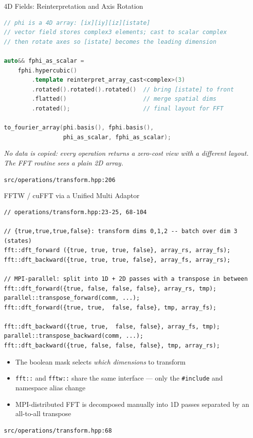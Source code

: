 \begin{frame}[fragile,label=inq4]{4D Fields: Reinterpretation and Axis Rotation}
\begin{lstlisting}[language=C++]
// phi is a 4D array: [ix][iy][iz][istate]
// vector field stores complex3 elements; cast to scalar complex
// then rotate axes so [istate] becomes the leading dimension

auto&& fphi_as_scalar =
    fphi.hypercubic()
        .template reinterpret_array_cast<complex>(3)
        .rotated().rotated().rotated()  // bring [istate] to front
        .flatted()                      // merge spatial dims
        .rotated();                     // final layout for FFT

to_fourier_array(phi.basis(), fphi.basis(),
                 phi_as_scalar, fphi_as_scalar);
\end{lstlisting}
\textit{No data is copied: every operation returns a zero-cost view
with a different layout. The FFT routine sees a plain 2D array.}

\vspace{0.3em}
\tiny\texttt{src/operations/transform.hpp:206}
\end{frame}


\begin{frame}[fragile,label=inq5,shrink]{FFTW / cuFFT via a Unified Multi Adaptor}
\begin{lstlisting}
// operations/transform.hpp:23-25, 68-104

// {true,true,true,false}: transform dims 0,1,2 -- batch over dim 3 (states)
fft::dft_forward ({true, true, true, false}, array_rs, array_fs);
fft::dft_backward({true, true, true, false}, array_fs, array_rs);

// MPI-parallel: split into 1D + 2D passes with a transpose in between
fft::dft_forward({true, false, false, false}, array_rs, tmp);
parallel::transpose_forward(comm, ...);
fft::dft_forward({true, true,  false, false}, tmp, array_fs);

fft::dft_backward({true, true,  false, false}, array_fs, tmp);
parallel::transpose_backward(comm, ...);
fft::dft_backward({true, false, false, false}, tmp, array_rs);
\end{lstlisting}
\begin{itemize}
  \item The boolean mask selects \textit{which dimensions} to transform
  \item \texttt{fft::} and \texttt{fftw::} share the same interface ---
        only the \texttt{\#include} and namespace alias change
  \item MPI-distributed FFT is decomposed manually into 1D passes
        separated by an all-to-all transpose
\end{itemize}
\tiny\texttt{src/operations/transform.hpp:68}
\end{frame}

